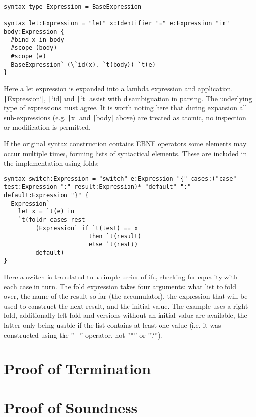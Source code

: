 \documentclass{kththesis}
\begin{document}
\begin{verbatim}
syntax type Expression = BaseExpression

syntax let:Expression = "let" x:Identifier "=" e:Expression "in" body:Expression {
  #bind x in body
  #scope (body)
  #scope (e)
  BaseExpression` (\`id(x). `t(body)) `t(e)
}
\end{verbatim}

Here a let expression is expanded into a lambda expression and application. \texttt|Expression`|, \texttt|`id| and \texttt|`t| assist with disambiguation in parsing. The underlying type of expressions must agree. It is worth noting here that during expansion all sub-expressions (e.g. \texttt|x| and \texttt|body| above) are treated as atomic, no inspection or modification is permitted.

If the original syntax construction contains EBNF operators some elements may occur multiple times, forming lists of syntactical elements. These are included in the implementation using folds:

\begin{verbatim}
syntax switch:Expression = "switch" e:Expression "{" cases:("case" test:Expression ":" result:Expression)* "default" ":" default:Expression "}" {
  Expression`
    let x = `t(e) in
    `t(foldr cases rest
         (Expression` if `t(test) == x
                        then `t(result)
                        else `t(rest))
         default)
}
\end{verbatim}

Here a switch is translated to a simple series of ifs, checking for equality with each case in turn. The fold expression takes four arguments: what list to fold over, the name of the result so far (the accumulator), the expression that will be used to construct the next result, and the initial value. The example uses a right fold, additionally left fold and versions without an initial value are available, the latter only being usable if the list contains at least one value (i.e. it was constructed using the ''+'' operator, not ''*'' or ''?'').

\section{Proof of Termination} \label{sec:proof-termination}

\section{Proof of Soundness} \label{sec:proof-no-errors}
\end{document}
